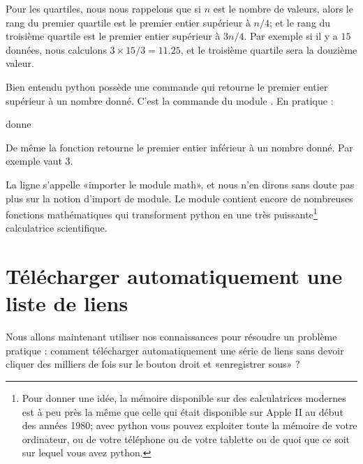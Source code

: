 Pour les quartiles, nous nous rappelons que si \( n\) est le nombre de valeurs, alors le rang du premier quartile est le premier entier supérieur à \( n/4\); et le rang du troisième quartile est le premier entier supérieur à \( 3n/4\). Par exemple si il y a \( 15\) données, nous calculons \( 3\times 15/3= 11.25\), et le troisième quartile sera la douzième valeur.


Bien entendu python possède une commande qui retourne le premier entier supérieur à un nombre donné. C'est la commande  du module . En pratique :



donne 


De même la fonction  retourne le premier entier inférieur à un nombre donné. Par exemple  vaut \( 3\).

La ligne  s'appelle «importer le module math», et nous n'en dirons sans doute pas plus sur la notion d'import de module. Le module  contient encore de nombreuses fonctions mathématiques qui transforment python en une très puissante\footnote{Pour donner une idée, la mémoire disponible sur des calculatrices modernes est à peu près la même que celle qui était disponible sur Apple II au début des années 1980; avec python vous pouvez exploiter toute la mémoire de votre ordinateur, ou de votre téléphone ou de votre tablette ou de quoi que ce soit sur lequel vous avez python.} calculatrice scientifique.




\section{Télécharger automatiquement une liste de liens}

Nous allons maintenant utiliser nos connaissances pour résoudre un problème pratique : comment télécharger automatiquement une série de liens sans devoir cliquer des milliers de fois sur le bouton droit et «enregistrer sous» ?

